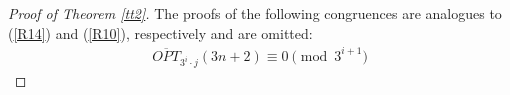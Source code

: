 \documentclass[12pt,reqno,a4paper]{amsart}
\numberwithin{equation}{section}
\begin{document}
  \begin{proof}[Proof of Theorem \ref{tt2}]
 The proofs  of the following congruences are analogues to (\ref{R14}) and (\ref{R10}), respectively and are omitted: 
    \begin{align}
       \label{R4} \overline{OPT}_{3^i\cdot j}(3n+2)\equiv 0\pmod{3^{i+1}}

\end{align}
\end{proof}
\end{document}
